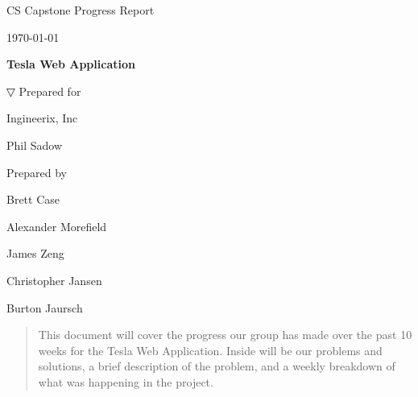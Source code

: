 \documentclass[onecolumn, draftclsnofoot,10pt, compsoc]{IEEEtran}
\def \CapstoneTeamName{                 The Ingineers}
\def \CapstoneTeamNumber{               22}
\def \GroupMemberOne{                   Brett Case}
\def \GroupMemberTwo{                   Alexander Morefield}
\def \GroupMemberThree{                 James Zeng}
\def \GroupMemberFour{                  Christopher Jansen}
\def \GroupMemberFive{                  Burton Jaursch}
\def \CapstoneProjectName{              Tesla Web Application}
\def \CapstoneSponsorCompany{           Ingineerix, Inc}
\def \CapstoneSponsorPerson{            Phil Sadow}
\def \DocType{                  %
                                Progress Report
                                }
\newcommand{\NameSigPair}[1]{\par
\makebox[2.75in][r]{#1} \hfil   \makebox[3.25in]{\makebox[2.25in]{\hrulefill} \hfill            \makebox[.75in]{\hrulefill}}
\par\vspace{-12pt} \textit{\tiny\noindent
\makebox[2.75in]{} \hfil                \makebox[3.25in]{\makebox[2.25in][r]{Signature} \hfill  \makebox[.75in][r]{Date}}}}
\renewcommand{\NameSigPair}[1]{#1}
\begin{document}
\begin{titlepage}
    \begin{singlespace}
        \hfill
        \par\vspace{.2in}
        \centering
        \scshape{
            \huge CS Capstone \DocType \par
            {\large\today}\par
            \vspace{.5in}
            \textbf{\Huge\CapstoneProjectName}\par
            \vfill

▽
            \vfill
            {\large Prepared for}\par
            \Huge \CapstoneSponsorCompany\par
            \vspace{5pt}
            {\Large\NameSigPair{\CapstoneSponsorPerson}\par}
            {\large Prepared by }\par
            \vspace{5pt}
            {\Large
                \NameSigPair{\GroupMemberOne}\par
                \NameSigPair{\GroupMemberTwo}\par
                \NameSigPair{\GroupMemberThree}\par
                \NameSigPair{\GroupMemberFour}\par
                \NameSigPair{\GroupMemberFive}\par
            }
            \vspace{20pt}
        }
        \begin{abstract}
        This document will cover the progress our group has made over the past 10 weeks for the Tesla Web Application. Inside will be our problems and solutions, a brief description of the problem, and a weekly breakdown of what was happening in the project.
        \end{abstract}
    \end{singlespace}
\end{titlepage}
\tableofcontents
\clearpage
\end{document}
